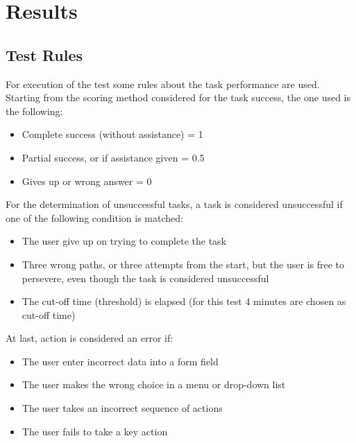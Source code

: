 %
%
\chapter{Results}

\section{Test Rules}
For execution of the test some rules about the task performance are used.
Starting from the scoring method considered for the task success, the one used is the following:
\begin{itemize}
\item Complete success (without assistance) = 1
\item Partial success, or if assistance given = 0.5
\item Gives up or wrong answer = 0
\end{itemize}
For the determination of unsuccessful tasks, a task is considered unsuccessful if one of the following condition is matched:
\begin{itemize}
\item The user give up on trying to complete the task
\item Three wrong paths, or three attempts from the start, but the user is free to persevere, even though the task is considered unsuccessful
\item The cut-off time (threshold) is elapsed (for this test 4 minutes are chosen as cut-off time)
\end{itemize}
At last, action is considered an error if:
\begin{itemize}
\item The user enter incorrect data into a form field
\item The user makes the wrong choice in a menu or drop-down list
\item The user takes an incorrect sequence of actions
\item The user fails to take a key action
\end{itemize}
%
%
